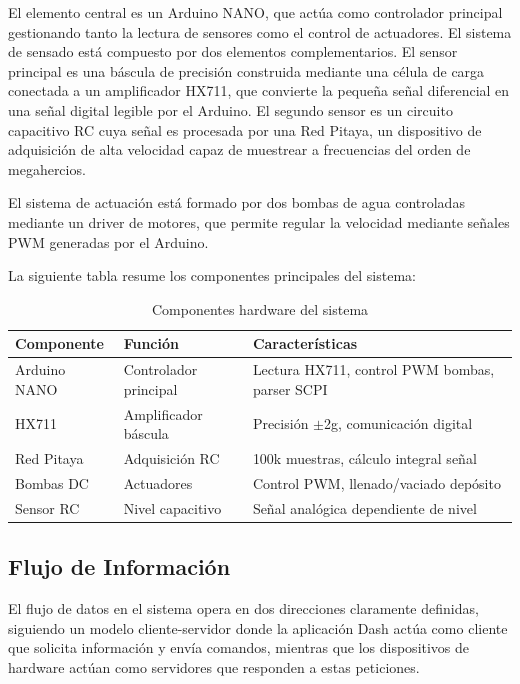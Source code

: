 \documentclass[12pt,a4paper]{article}
\begin{document}
El elemento central es un Arduino NANO, que actúa como controlador principal gestionando tanto la lectura de sensores como el control de actuadores. El sistema de sensado está compuesto por dos elementos complementarios. El sensor principal es una báscula de precisión construida mediante una célula de carga conectada a un amplificador HX711, que convierte la pequeña señal diferencial en una señal digital legible por el Arduino. El segundo sensor es un circuito capacitivo RC cuya señal es procesada por una Red Pitaya, un dispositivo de adquisición de alta velocidad capaz de muestrear a frecuencias del orden de megahercios.

El sistema de actuación está formado por dos bombas de agua controladas mediante un driver de motores, que permite regular la velocidad mediante señales PWM generadas por el Arduino.

La siguiente tabla resume los componentes principales del sistema:

\begin{table}[H]
\centering
\caption{Componentes hardware del sistema}
\begin{tabular}{@{}llp{6cm}@{}}
\toprule
\textbf{Componente} & \textbf{Función} & \textbf{Características} \\
\midrule
Arduino NANO & Controlador principal & Lectura HX711, control PWM bombas, parser SCPI \\
HX711 & Amplificador báscula & Precisión $\pm$2g, comunicación digital \\
Red Pitaya & Adquisición RC & 100k muestras, cálculo integral señal \\
Bombas DC & Actuadores & Control PWM, llenado/vaciado depósito \\
Sensor RC & Nivel capacitivo & Señal analógica dependiente de nivel \\
\bottomrule
\end{tabular}
\end{table}

\subsection{Flujo de Información}

El flujo de datos en el sistema opera en dos direcciones claramente definidas, siguiendo un modelo cliente-servidor donde la aplicación Dash actúa como cliente que solicita información y envía comandos, mientras que los dispositivos de hardware actúan como servidores que responden a estas peticiones.
\end{document}
